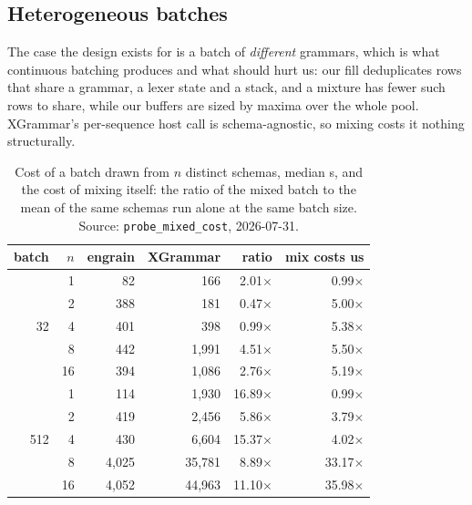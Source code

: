 \documentclass{article}
\begin{document}
\subsection{Heterogeneous batches}
\label{sec:eval-mixed}

The case the design exists for is a batch of \emph{different} grammars, which is
what continuous batching produces and what should hurt us: our fill deduplicates
rows that share a grammar, a lexer state and a stack, and a mixture has fewer
such rows to share, while our buffers are sized by maxima over the whole pool.
XGrammar's per-sequence host call is schema-agnostic, so mixing costs it nothing
structurally.

\begin{table}[t]
\caption{Cost of a batch drawn from $n$ distinct schemas, median \textmu{}s, and
the cost of mixing itself: the ratio of the mixed batch to the mean of the same
schemas run alone at the same batch size.
Source: \texttt{probe\_mixed\_cost}, 2026-07-31.}
\label{tab:mixed}
\vskip 0.1in
\begin{center}
\begin{small}
\begin{tabular}{rrrrrr}
\toprule
batch & $n$ & engrain & XGrammar & ratio & mix costs us \\
\midrule
\multirow{5}{*}{32}
 & 1  & 82    & 166    & 2.01$\times$ & 0.99$\times$ \\
 & 2  & 388   & 181    & 0.47$\times$ & 5.00$\times$ \\
 & 4  & 401   & 398    & 0.99$\times$ & 5.38$\times$ \\
 & 8  & 442   & 1{,}991 & 4.51$\times$ & 5.50$\times$ \\
 & 16 & 394   & 1{,}086 & 2.76$\times$ & 5.19$\times$ \\
\multirow{5}{*}{512}
 & 1  & 114   & 1{,}930 & 16.89$\times$ & 0.99$\times$ \\
 & 2  & 419   & 2{,}456 & 5.86$\times$ & 3.79$\times$ \\
 & 4  & 430   & 6{,}604 & 15.37$\times$ & 4.02$\times$ \\
 & 8  & 4{,}025 & 35{,}781 & 8.89$\times$ & 33.17$\times$ \\
 & 16 & 4{,}052 & 44{,}963 & 11.10$\times$ & 35.98$\times$ \\
\bottomrule
\end{tabular}
\end{small}
\end{center}
\vskip -0.1in
\end{table}
\end{document}
